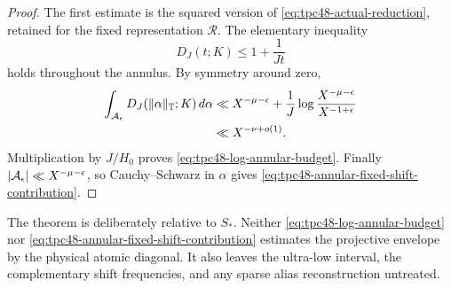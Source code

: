 \begin{proof}
The first estimate is the squared version of
\eqref{eq:tpc48-actual-reduction}, retained for the fixed
representation \(\mathscr R\).  The elementary inequality
\begin{equation}
 D_J(t;K)\le 1+\frac1{Jt}
 \label{eq:tpc48-annulus-D-bound}
\end{equation}
holds throughout the annulus.  By symmetry around zero,
\begin{align}
 \int_{\mathcal A_\epsilon}D_J(\|\alpha\|_\mathbb T;K)\,d\alpha
 &\ll X^{-\mu-\epsilon}
   +\frac1J\log\frac{X^{-\mu-\epsilon}}
                         {X^{-1+\epsilon}} \\
 &\ll X^{-\nu+o(1)}.
 \label{eq:tpc48-integrated-D}
\end{align}
Multiplication by \(J/H_0\) proves
\eqref{eq:tpc48-log-annular-budget}.  Finally
\(|\mathcal A_\epsilon|\ll X^{-\mu-\epsilon}\), so Cauchy--Schwarz in
\(\alpha\) gives
\eqref{eq:tpc48-annular-fixed-shift-contribution}.
\end{proof}

The theorem is deliberately relative to \(S_*\).  Neither
\eqref{eq:tpc48-log-annular-budget} nor
\eqref{eq:tpc48-annular-fixed-shift-contribution} estimates the
projective envelope by the physical atomic diagonal.  It also leaves
the ultra-low interval, the complementary shift frequencies, and any
sparse alias reconstruction untreated.
